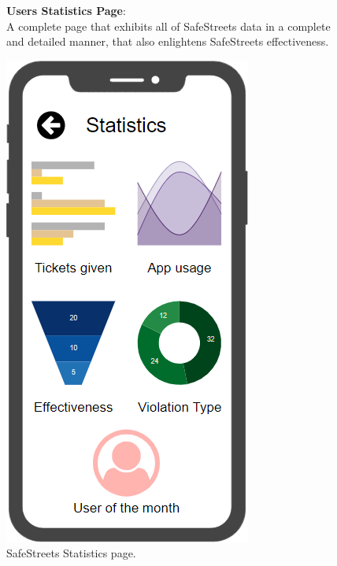 \begin{figure}
	\begin{flushleft}
		\textbf{Users Statistics Page}:\\
		A complete page that exhibits all of SafeStreets data in a complete and detailed manner, that also enlightens SafeStreets effectiveness. 
	\end{flushleft}
	\centering
	\includegraphics[width=0.6\linewidth]{../RASD/images/mockups/statistics}
	\caption{SafeStreets Statistics page.}
	\label{fig:statistics}
\end{figure}
\clearpage
